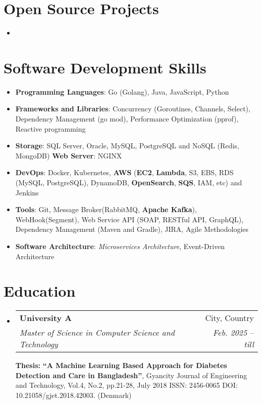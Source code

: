 \documentclass[letterpaper,11pt]{article}
\makeatletter
\newcommand{\resumeSubheading}[4]{
  \vspace{-1pt}\item
    \begin{tabular*}{0.97\textwidth}{l@{\extracolsep{\fill}}r}
      \textbf{#1} & #2 \\
      \textit{\small#3} & \textit{\small #4} \\
    \end{tabular*}\vspace{-5pt}
}
\newcommand{\resumeSubHeadingListStart}{\begin{itemize}[leftmargin=*]}
\newcommand{\resumeSubHeadingListEnd}{\end{itemize}}
\makeatother
\begin{document}
\section{Open Source Projects}
  \resumeSubHeadingListStart
    \item{
    }
  \resumeSubHeadingListEnd

\section{Software Development Skills}
  \resumeSubHeadingListStart
    \item{
      \textbf{Programming Languages}{: Go (Golang), Java, JavaScript, Python}
    }
    \item{
      \textbf{Frameworks and Libraries}{:  Concurrency (Goroutines, Channels, Select), Dependency Management (go mod), Performance Optimization (pprof), Reactive programming}
    }
    \item{
      \textbf{Storage}{: SQL Server, Oracle, MySQL, PostgreSQL and NoSQL (Redis, MongoDB)}\textbf{ Web Server}{: NGINX }
    }
    \item{
      \textbf{DevOps}{: Docker, Kubernetes, \textbf{AWS} (\textbf{EC2}, \textbf{Lambda}, S3, EBS, RDS (MySQL, PostgreSQL), DynamoDB, \textbf{OpenSearch}, \textbf{SQS}, IAM, etc) and Jenkins}
    }
    \item{
      \textbf{Tools}{: Git, Message Broker(RabbitMQ, \textbf{Apache Kafka}), WebHook(Segment), Web Service API (SOAP, RESTful API, GraphQL), Dependency Management (Maven and Gradle), JIRA, Agile Methodologies}
    }
     \item{
      \textbf{Software Architecture}{: \textit{Microservices Architecture}, Event-Driven Architecture}
    }
    
  \resumeSubHeadingListEnd

\section{Education}
  \resumeSubHeadingListStart
    \resumeSubheading
     {University A}{City, Country}
      {Master of Science in Computer Science and Technology}{Feb. 2025 -- till}
      \break
      \textbf{Thesis: }\textbf{“A Machine Learning Based Approach for Diabetes Detection and Care in Bangladesh”}{, Gyancity Journal of  Engineering and Technology, Vol.4, No.2, pp.21-28, July 2018 ISSN: 2456-0065 DOI: 10.21058/gjet.2018.42003.  (Denmark)}
  \resumeSubHeadingListEnd
\end{document}
